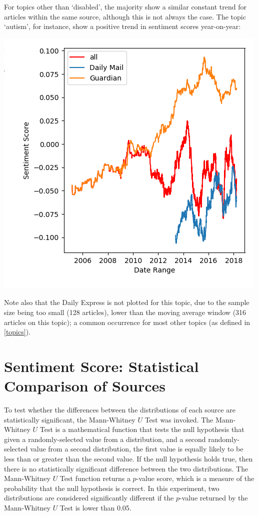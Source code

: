 \documentclass{report}
\begin{document}
For topics other than `disabled', the majority show a similar constant trend for articles within the same source, although this is not always the case. The topic `autism', for instance, show a positive trend in sentiment scores year-on-year:

\begin{center}
	\includegraphics[width=0.5\linewidth]{autism.png}
\end{center}

Note also that the Daily Express is not plotted for this topic, due to the sample size being too small (128 articles), lower than the moving average window (316 articles on this topic); a common occurrence for most other topics (as defined in \ref{topics}).

\section{Sentiment Score: Statistical Comparison of Sources} \label{Sentiment score: statistical comparison of different sources}

To test whether the differences between the distributions of each source are statistically significant, the Mann-Whitney $U$ Test \cite{mann1947test} was invoked.
The Mann-Whitney $U$ Test is a mathematical function that tests the null hypothesis that given a randomly-selected value from a distribution, and a second randomly-selected value from a second distribution, the first value is equally likely to be less than or greater than the second value.
If the null hypothesis holds true, then there is no statistically significant difference between the two distributions.
The Mann-Whitney $U$ Test function returns a $p$-value score, which is a measure of the probability that the null hypothesis is correct.
In this experiment, two distributions are considered significantly different if the $p$-value returned by the Mann-Whitney $U$ Test is lower than 0.05.
\end{document}
